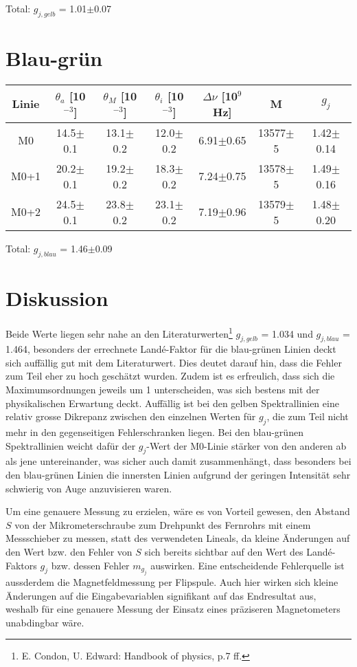 \documentclass[a4paper,parskip,11pt, DIV12]{scrreprt}
\begin{document}
Total: $g_{j,gelb}$ = 1.01$\pm$0.07

	\section{Blau-grün}

\begin{tabular}{|c|c|c|c|c|c|c|}
\hline 
Linie  & $\theta_a$ [10$^{-3}$]& $\theta_M$ [10$^{-3}$]& $\theta_i$ [10$^{-3}$]& $\Delta \nu$ [10$^{9}$Hz] & M & $g_j$ \\ 
\hline 
\hline
M0 & 14.5$\pm$0.1 & 13.1$\pm$0.2 & 12.0$\pm$0.2 & 6.91$\pm$0.65 & 13577$\pm$5 & 1.42$\pm$0.14 \\ 
\hline 
M0+1 & 20.2$\pm$0.1 & 19.2$\pm$0.2 & 18.3$\pm$0.2 & 7.24$\pm$0.75 & 13578$\pm$5 & 1.49$\pm$0.16 \\ 
\hline 
M0+2 & 24.5$\pm$0.1 & 23.8$\pm$0.2 & 23.1$\pm$0.2 & 7.19$\pm$0.96 & 13579$\pm$5 & 1.48$\pm$0.20 \\ 
\hline 
\end{tabular} 

Total: $g_{j,blau}$ = 1.46$\pm$0.09

\clearpage

	\section{Diskussion}
	
	Beide Werte liegen sehr nahe an den Literaturwerten\footnote{E. Condon, U. Edward: Handbook of physics, p.7 ff.} $g_{j,gelb}$ = 1.034 und $g_{j,blau}$ = 1.464, besonders der errechnete Landé-Faktor für die blau-grünen Linien deckt sich auffällig gut mit dem Literaturwert. Dies deutet darauf hin, dass die Fehler zum Teil eher zu hoch geschätzt wurden. Zudem ist es erfreulich, dass sich die Maximumsordnungen jeweils um 1 unterscheiden, was sich bestens mit der physikalischen Erwartung deckt. Auffällig ist bei den gelben Spektrallinien eine relativ grosse Dikrepanz zwischen den einzelnen Werten für $g_j$, die zum Teil nicht mehr in den gegenseitigen Fehlerschranken liegen. Bei den blau-grünen Spektrallinien weicht dafür der $g_j$-Wert der M0-Linie stärker von den anderen ab als jene untereinander, was sicher auch damit zusammenhängt, dass besonders bei den blau-grünen Linien die innersten Linien aufgrund der geringen Intensität sehr schwierig von Auge anzuvisieren waren.
	
	Um eine genauere Messung zu erzielen, wäre es von Vorteil gewesen, den Abstand $S$ von der Mikrometerschraube zum Drehpunkt des Fernrohrs mit einem Messschieber zu messen, statt des verwendeten Lineals, da kleine Änderungen auf den Wert bzw. den Fehler von $S$ sich bereits sichtbar auf den Wert des Landé-Faktors $g_j$ bzw. dessen Fehler $m_{g_j}$ auswirken. Eine entscheidende Fehlerquelle ist aussderdem die Magnetfeldmessung per Flipspule. Auch hier wirken sich kleine Änderungen auf die Eingabevariablen signifikant auf das Endresultat aus, weshalb für eine genauere Messung der Einsatz eines präziseren Magnetometers unabdingbar wäre.
	
\end{document}
